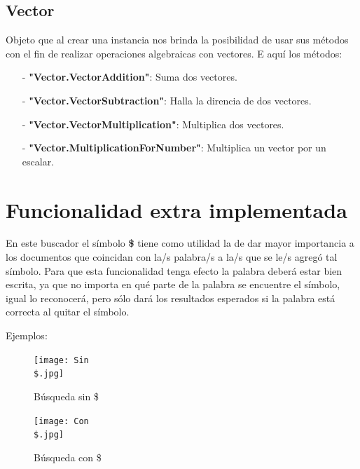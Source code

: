\documentclass[a4paper,12pt]{article}
\begin{document}
\begin{center}
 \subsection{Vector}
 
 Objeto que al crear una instancia nos brinda la posibilidad de usar sus métodos con el fin de 
 realizar operaciones algebraicas con vectores. E aquí los métodos:
 \begin{itemize}
    \item[-] \textbf{"Vector.VectorAddition"}: Suma dos vectores.
    \item[-] \textbf{"Vector.VectorSubtraction"}: Halla la direncia de dos vectores.
    \item[-] \textbf{"Vector.VectorMultiplication"}: Multiplica dos vectores.
    \item[-] \textbf{"Vector.MultiplicationForNumber"}: Multiplica un vector por un escalar.
 \end{itemize}



\section{Funcionalidad extra implementada} 
 
 En este buscador el símbolo \textbf{\$} tiene como utilidad la de dar mayor importancia a los documentos que
 coincidan con la/s palabra/s a la/s que se le/s agregó tal símbolo. Para que esta funcionalidad tenga
 efecto la palabra deberá estar bien escrita, ya que no importa en qué parte de la palabra se encuentre 
 el símbolo, igual lo reconocerá, pero sólo dará los resultados esperados si la palabra está correcta al
 quitar el símbolo. 

 \end{center}
 
 Ejemplos:


 \begin{figure}[h]
    \center
    \texttt{[image: Sin \\\$.jpg]}
    \caption{Búsqueda sin \$}
 \end{figure}


 \begin{figure}[h]
    \center
    \texttt{[image: Con \\\$.jpg]}
    \caption{Búsqueda con \$}
 \end{figure}
\end{document}
